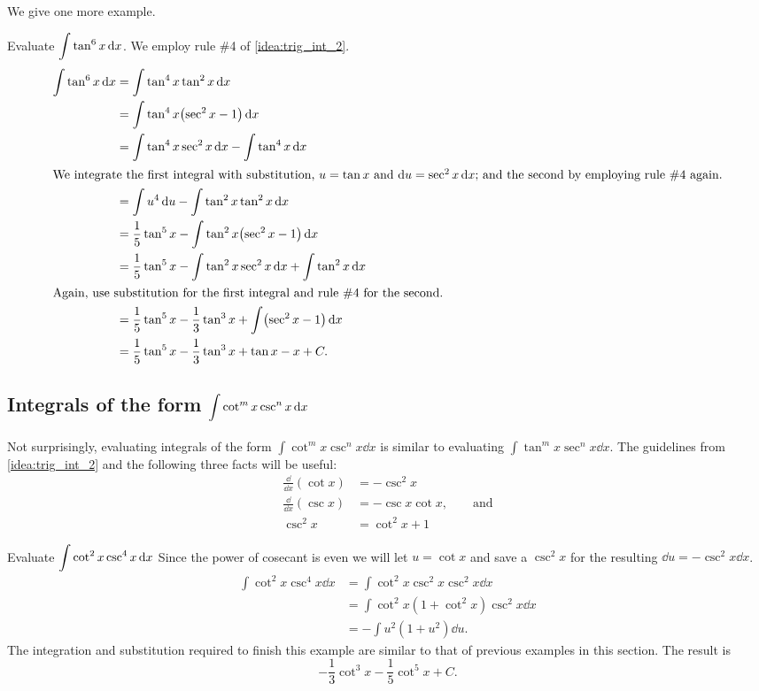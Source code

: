 We give one more example.

\begin{example}\label{ex_trigint7}%
Evaluate $\displaystyle\int\tan^6x\operatorname{d}\! x$.
\solution
We employ rule \#4 of \autoref{idea:trig_int_2}. 
\begin{align*}
	\int \tan^6x\dd x
	&= \int \tan^4x\tan^2x\dd x \\
	&= \int\tan^4x\bigl(\sec^2x-1\bigr)\dd x\\
	&= \int\tan^4x\sec^2x\dd x - \int\tan^4x\dd x \\
\intertext{We integrate the first integral with substitution, \intertextmath{u=\tan x} and \intertextmath{\dd u=\sec^2x\dd x}; and the second by employing rule \#4 again.}
	&= \int u^4\dd u-\int\tan^2 x\tan^2 x\dd x \\
	&=	\frac15\tan^5x-\int\tan^2x\bigl(\sec^2x-1\bigr)\dd x \\
	&= \frac15\tan^5x -\int\tan^2x\sec^2x\dd x + \int\tan^2x\dd x\\
\intertext{Again, use substitution for the first integral and rule \#4 for the second.}
	&= \frac15\tan^5x-\frac13\tan^3x+\int\bigl(\sec^2x-1\bigr)\dd x \\
	&=	 \frac15\tan^5x-\frac13\tan^3x+\tan x - x+C.
\end{align*}
\end{example}

\subsection{Integrals of the form \texorpdfstring{$\displaystyle\int\cot^mx\csc^nx\operatorname{d}\! x$}{∫(cot x)\^{}m (csc x)\^{}n dx}}

Not surprisingly, evaluating integrals of the form $\int\cot^mx\csc^nx\dd x$ is similar to evaluating $\int\tan^mx\sec^nx\dd x$. The guidelines from \autoref{idea:trig_int_2} and the following three facts will be useful:
\begin{align*}
 \frac{\dd}{\dd x}(\cot x) &= -\csc^2x \\
 \frac{\dd}{\dd x}(\csc x) &= -\csc x\cot x,\qquad\text{and} \\
 \csc^2 x &= \cot^2x+1
\end{align*}

\begin{example}\label{ex_int_cot_csc}%
Evaluate $\displaystyle\int\cot^2x\csc^4x\operatorname{d}\! x$
\solution
Since the power of cosecant is even we will let $u=\cot x$ and save a $\csc^2x$ for the resulting $\dd u=-\csc^2x\dd x$.
\begin{align*}
 \int\cot^2x\csc^4x\dd x
 &=\int\cot^2x\csc^2x\csc^2x\dd x \\
 &=\int\cot^2x(1+\cot^2x)\csc^2x\dd x \\
 &=-\int u^2(1+u^2)\dd u.
\end{align*}
The integration and substitution required to finish this example are similar to that of previous examples in this section. The result is
\[-\frac13\cot^3x-\frac15\cot^5x+C.\]
\end{example}

